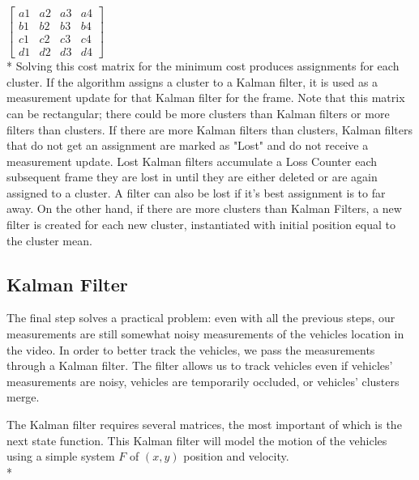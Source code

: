 \documentclass{article} %
\begin{document}
{\centering
$\begin{bmatrix}
a1 & a2 & a3 & a4\\
b1 & b2 & b3 & b4\\
c1 & c2 & c3 & c4\\
d1 & d2 & d3 & d4\end{bmatrix}$\linebreak\newline\\*}
Solving this cost matrix for the minimum cost produces assignments for each cluster. If the algorithm assigns a cluster to a Kalman filter, it is used as a measurement update for that Kalman filter for the frame. Note that this matrix can be rectangular; there could be more clusters than Kalman filters or more filters than clusters. If there are more Kalman filters than clusters, Kalman filters that do not get an assignment are marked as "Lost" and do not receive a measurement update. Lost Kalman filters accumulate a Loss Counter each subsequent frame they are lost in until they are either deleted or are again assigned to a cluster. A filter can also be lost if it's best assignment is to far away.  On the other hand, if there are more clusters than Kalman Filters, a new filter is created for each new cluster, instantiated with initial position equal to the cluster mean.

\subsection{Kalman Filter}
\label{subsec:kalman_filter}

The final step solves a practical problem: even with all the previous steps, our measurements are still somewhat noisy measurements of the vehicles location in the video. In order to better track the vehicles, we pass the measurements through a Kalman filter. The filter allows us to track vehicles even if vehicles' measurements are noisy, vehicles are temporarily occluded, or vehicles' clusters merge.

The Kalman filter requires several matrices, the most important of which is the next state function. This Kalman filter will model the motion of the vehicles using a simple system $F$ of $(x,y)$ position and velocity. \\*
\end{document}
